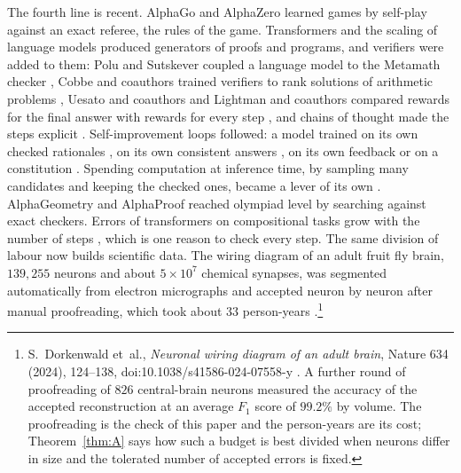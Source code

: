 The fourth line is recent. AlphaGo \cite{SHM16} and AlphaZero \cite{SHS18} learned games by self-play against an exact referee, the rules of the game. Transformers \cite{VSP17} and the scaling of language models \cite{BMR20,KMH20,HBM22} produced generators of proofs and programs, and verifiers were added to them: Polu and Sutskever coupled a language model to the Metamath checker \cite{PS20}, Cobbe and coauthors trained verifiers to rank solutions of arithmetic problems \cite{CKB21}, Uesato and coauthors and Lightman and coauthors compared rewards for the final answer with rewards for every step \cite{UKK22,LKB23}, and chains of thought made the steps explicit \cite{WWS22}. Self-improvement loops followed: a model trained on its own checked rationales \cite{ZWM22}, on its own consistent answers \cite{HGH22}, on its own feedback \cite{MTG23} or on a constitution \cite{BKK22}. Spending computation at inference time, by sampling many candidates and keeping the checked ones, became a lever of its own \cite{BJE24,SLX24}. AlphaGeometry \cite{TWL24} and AlphaProof \cite{HMS25} reached olympiad level by searching against exact checkers. Errors of transformers on compositional tasks grow with the number of steps \cite{DLS23}, which is one reason to check every step. The same division of labour now builds scientific data. The wiring diagram of an adult fruit fly brain, $139{,}255$ neurons and about $5\times10^{7}$ chemical synapses, was segmented automatically from electron micrographs and accepted neuron by neuron after manual proofreading, which took about $33$ person-years \cite{DMS24}.\footnote{S.~Dorkenwald et~al., \emph{Neuronal wiring diagram of an adult brain}, Nature 634 (2024), 124--138, doi:10.1038/s41586-024-07558-y \cite{DMS24}. A further round of proofreading of $826$ central-brain neurons measured the accuracy of the accepted reconstruction at an average $F_{1}$ score of $99.2\%$ by volume. The proofreading is the check of this paper and the person-years are its cost; Theorem~\ref{thm:A} says how such a budget is best divided when neurons differ in size and the tolerated number of accepted errors is fixed.}


